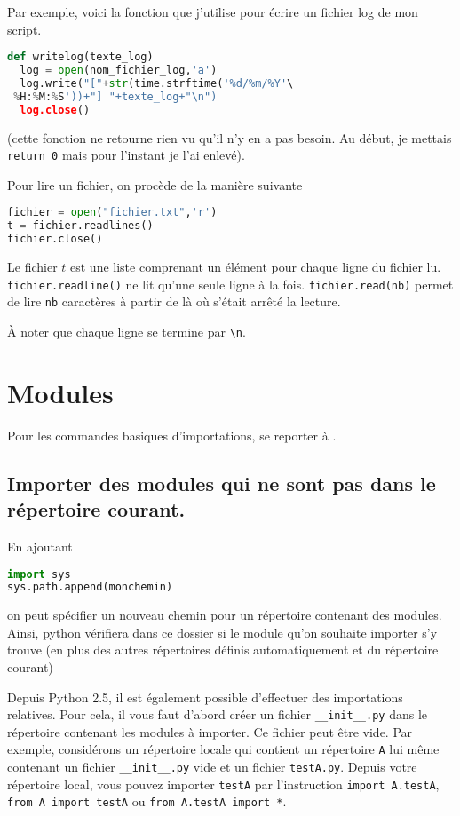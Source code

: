 \documentclass[a4paper,twoside]{article}
\begin{document}
Par exemple, voici la fonction que j'utilise pour écrire un fichier log de mon script.

\begin{lstlisting}[language=python]
def writelog(texte_log)
  log = open(nom_fichier_log,'a')
  log.write("["+str(time.strftime('%d/%m/%Y'\
 %H:%M:%S'))+"] "+texte_log+"\n")
  log.close()
\end{lstlisting}
(cette fonction ne retourne rien vu qu'il n'y en a pas besoin. Au début, je mettais \verb|return 0| mais pour l'instant je l'ai enlevé).

\bigskip

Pour lire un fichier, on procède de la manière suivante
\begin{lstlisting}[language=python]
fichier = open("fichier.txt",'r')
t = fichier.readlines()
fichier.close()
\end{lstlisting}

Le fichier $t$ est une liste comprenant un élément pour chaque ligne du fichier lu. \texttt{fichier.readline()} ne lit qu'une seule ligne à la fois. \texttt{fichier.read(nb)} permet de lire \texttt{nb} caractères à partir de là où s'était arrêté la lecture.

\begin{remarque}
À noter que chaque ligne se termine par \verb|\n|.
\end{remarque}

\section{Modules}
Pour les commandes basiques d'importations, se reporter à .

\subsection{Importer des modules qui ne sont pas dans le répertoire courant.}
En ajoutant
\begin{lstlisting}[language=python]
import sys
sys.path.append(monchemin)
\end{lstlisting}
on peut spécifier un nouveau chemin pour un répertoire contenant des modules. Ainsi, python vérifiera dans ce dossier si le module qu'on souhaite importer s'y trouve (en plus des autres répertoires définis automatiquement et du répertoire courant)

\bigskip

Depuis Python 2.5, il est également possible d'effectuer des importations relatives. Pour cela, il vous faut d'abord créer un fichier \verb|__init__.py| dans le répertoire contenant les modules à importer. Ce fichier peut être vide. Par exemple, considérons un répertoire locale qui contient un répertoire \texttt{A} lui même contenant un fichier \verb|__init__.py| vide et un fichier \texttt{testA.py}. Depuis votre répertoire local, vous pouvez importer \texttt{testA} par l'instruction \texttt{import A.testA}, \texttt{from A import testA} ou \texttt{from A.testA import *}.
\end{document}
